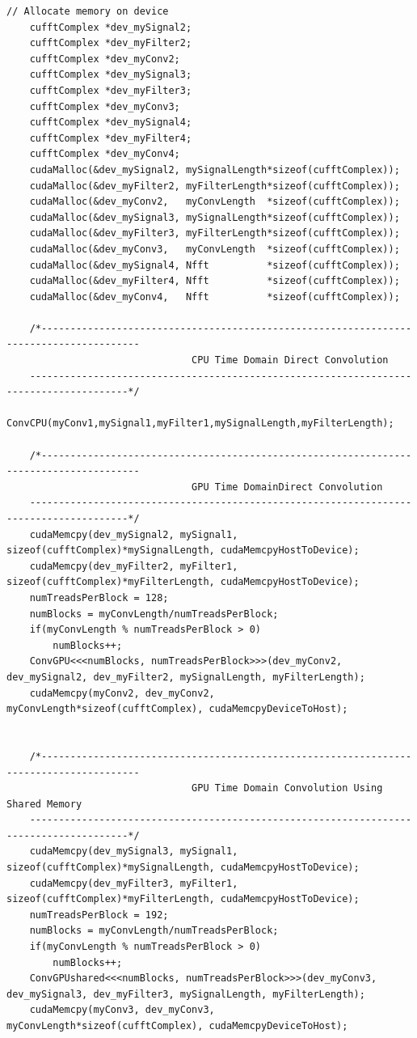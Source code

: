 \begin{lstlisting}[caption={CUDA code to performing complex convolution four different ways: time domain CPU, time domain GPU, time domain GPU using shared memory and frequency domain GPU.},label={code:convFun}]
	// Allocate memory on device
	cufftComplex *dev_mySignal2;
	cufftComplex *dev_myFilter2;
	cufftComplex *dev_myConv2;
	cufftComplex *dev_mySignal3;
	cufftComplex *dev_myFilter3;
	cufftComplex *dev_myConv3;
	cufftComplex *dev_mySignal4;
	cufftComplex *dev_myFilter4;
	cufftComplex *dev_myConv4;
	cudaMalloc(&dev_mySignal2, mySignalLength*sizeof(cufftComplex));
	cudaMalloc(&dev_myFilter2, myFilterLength*sizeof(cufftComplex));
	cudaMalloc(&dev_myConv2,   myConvLength  *sizeof(cufftComplex));
	cudaMalloc(&dev_mySignal3, mySignalLength*sizeof(cufftComplex));
	cudaMalloc(&dev_myFilter3, myFilterLength*sizeof(cufftComplex));
	cudaMalloc(&dev_myConv3,   myConvLength  *sizeof(cufftComplex));
	cudaMalloc(&dev_mySignal4, Nfft          *sizeof(cufftComplex));
	cudaMalloc(&dev_myFilter4, Nfft          *sizeof(cufftComplex));
	cudaMalloc(&dev_myConv4,   Nfft          *sizeof(cufftComplex));

	/*---------------------------------------------------------------------------------------
                                CPU Time Domain Direct Convolution
	---------------------------------------------------------------------------------------*/
	ConvCPU(myConv1,mySignal1,myFilter1,mySignalLength,myFilterLength);

	/*---------------------------------------------------------------------------------------
                                GPU Time DomainDirect Convolution
	---------------------------------------------------------------------------------------*/
	cudaMemcpy(dev_mySignal2, mySignal1, sizeof(cufftComplex)*mySignalLength, cudaMemcpyHostToDevice);
	cudaMemcpy(dev_myFilter2, myFilter1, sizeof(cufftComplex)*myFilterLength, cudaMemcpyHostToDevice);
	numTreadsPerBlock = 128;
	numBlocks = myConvLength/numTreadsPerBlock;
	if(myConvLength % numTreadsPerBlock > 0)
		numBlocks++;
	ConvGPU<<<numBlocks, numTreadsPerBlock>>>(dev_myConv2, dev_mySignal2, dev_myFilter2, mySignalLength, myFilterLength);
	cudaMemcpy(myConv2, dev_myConv2, myConvLength*sizeof(cufftComplex), cudaMemcpyDeviceToHost);


	/*---------------------------------------------------------------------------------------
                                GPU Time Domain Convolution Using Shared Memory
	---------------------------------------------------------------------------------------*/
	cudaMemcpy(dev_mySignal3, mySignal1, sizeof(cufftComplex)*mySignalLength, cudaMemcpyHostToDevice);
	cudaMemcpy(dev_myFilter3, myFilter1, sizeof(cufftComplex)*myFilterLength, cudaMemcpyHostToDevice);
	numTreadsPerBlock = 192;
	numBlocks = myConvLength/numTreadsPerBlock;
	if(myConvLength % numTreadsPerBlock > 0)
		numBlocks++;
	ConvGPUshared<<<numBlocks, numTreadsPerBlock>>>(dev_myConv3, dev_mySignal3, dev_myFilter3, mySignalLength, myFilterLength);
	cudaMemcpy(myConv3, dev_myConv3, myConvLength*sizeof(cufftComplex), cudaMemcpyDeviceToHost);


\end{lstlisting}
